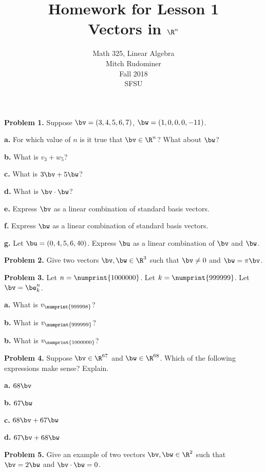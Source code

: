 \documentclass[oneside,12pt]{amsart}
\begin{document}
\title{Homework for Lesson 1 \\ Vectors in $\R^n$}
\author{Math 325, Linear Algebra \\ Mitch Rudominer \\ Fall 2018 \\ SFSU }
\date{}

\maketitle


\textbf{Problem 1.} Suppose $\bv = (3, 4, 5, 6, 7)$, $\bw = (1, 0 ,0 , 0, -11)$.

\bigskip

\textbf{a.} For which value of $n$ is it true that $\bv \in \R^n$? What
about $\bw$?

\bigskip

\textbf{b.} What is $v_3 + w_5$?

\bigskip

\textbf{c.} What is $3 \bv + 5 \bw$?

\bigskip

\textbf{d.} What is $\bv \cdot \bw$?

\bigskip

\textbf{e.} Express $\bv$ as a linear combination of standard basis vectors.

\bigskip

\textbf{f.} Express $\bw$ as a linear combination of standard basis vectors.

\bigskip

\textbf{g.} Let $\bu = (0, 4, 5, 6, 40)$. Express $\bu$ as a linear combination
of $\bv$ and $\bw$.

\bigskip

\textbf{Problem 2.} Give two vectors $\bv,\bw\in\R^3$ such that $\bv\not= 0$
and $\bw = \pi \bv$.

\bigskip

\textbf{Problem 3.} Let $n = \numprint{1000000}$. Let $k = \numprint{999999}$. Let
$\bv = \be^n_k$.

\bigskip

\textbf{a.} What is $v_{\numprint{999998}}$?

\bigskip

\textbf{b.} What is $v_{\numprint{999999}}$?

\bigskip

\textbf{b.} What is $v_{\numprint{1000000}}$?

\bigskip

\textbf{Problem 4.} Suppose $\bv\in\R^{67}$ and $\bw\in\R^{68}$.  Which of
the following expressions make sense? Explain.

\bigskip

\textbf{a.} $68 \bv$

\bigskip

\textbf{b.} $67 \bw$

\bigskip

\textbf{c.} $68 \bv + 67 \bw$

\bigskip

\textbf{d.} $67 \bv + 68 \bw$

\bigskip

\textbf{Problem 5.} Give an example of two vectors $\bv, \bw \in \R^2$
such that $\bv = 2 \bw$ and $\bv \cdot \bw = 0$.
\end{document}
